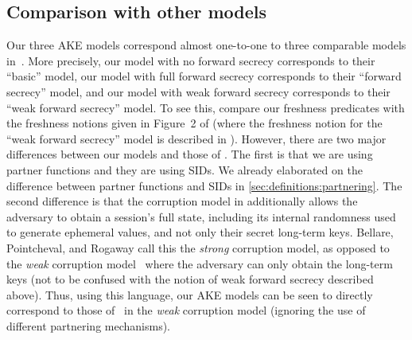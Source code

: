   


\subsection{Comparison with other models}
Our three AKE models correspond almost one-to-one to three comparable models in~\cite{EC:BelPoiRog00}.
More precisely,
our \akenfstext model with no forward secrecy corresponds to their ``basic'' model,
our \akefstext model with full forward secrecy corresponds to their ``forward secrecy'' model,
and our \akewfstext model with weak forward secrecy corresponds to their ``weak forward secrecy'' model.
To see this, compare our freshness predicates with the freshness notions given in Figure~2  of \cite{EC:BelPoiRog00} 
(where the freshness notion for the ``weak forward secrecy'' model is  described in \cite[Remark~7]{EC:BelPoiRog00}).
However,
there are two major differences between our models and those of \cite{EC:BelPoiRog00}.
The first is that we are using partner functions and they are using SIDs.
We already elaborated on the difference between partner functions and SIDs in \cref{sec:definitions:partnering}.
The second difference is that the corruption model in \cite{EC:BelPoiRog00} additionally allows the adversary to obtain a session's full state,
including its internal randomness used to generate ephemeral values,
and not only their secret long-term keys.
Bellare, Pointcheval, and Rogaway call this the \emph{strong} corruption model,
as opposed to the \emph{weak} corruption model~\cite[Remark~3]{EC:BelPoiRog00} where the adversary can only obtain the long-term keys
(not to be confused with the notion of weak forward secrecy described above).
Thus,
using this language,
our AKE models can be seen to directly correspond to those of~\cite{EC:BelPoiRog00} in the \emph{weak} corruption model
(ignoring the use of different partnering mechanisms).

